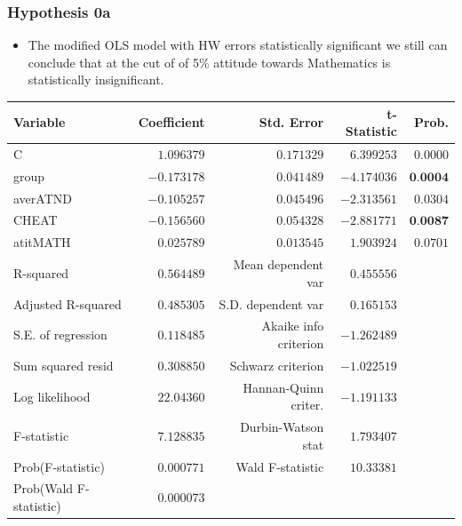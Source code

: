 \documentclass{beamer} %
\theoremstyle{definition}
\begin{document}
	\begin{frame}
		\frametitle{Hypothesis 0a}
		\centering 
		\begin{itemize}
			\item The modified OLS model with HW errors statistically significant we still can conclude that at the cut of of 5\% attitude towards Mathematics is statistically insignificant.  
		\end{itemize}
		\vspace{1em}
			\begin{table}[!htbp]
			\centering
			\tiny
			\begin{tabular}{lrrrr}
				\hline
				Variable & Coefficient & Std. Error & t-Statistic & Prob. \\
				\hline
				C & $1.096379$  & $0.171329$  & $6.399253$  & $0.0000$ \\
				group & $-0.173178$ & $0.041489$  & $-4.174036$ & $\textbf{0.0004}$ \\
				averATND & $-0.105257$ & $0.045496$  & $-2.313561$ & $0.0304$ \\
				CHEAT & $-0.156560$ & $0.054328$  & $-2.881771$ & $\textbf{0.0087}$ \\
				atitMATH & $0.025789$  & $0.013545$  & $1.903924$  & $0.0701$ \\
				\hline
				R-squared & $0.564489$ & Mean dependent var & $0.455556$ &  \\
				Adjusted R-squared & $0.485305$ & S.D. dependent var & $0.165153$ &  \\
				S.E. of regression & $0.118485$ & Akaike info criterion & $-1.262489$ &  \\
				Sum squared resid & $0.308850$ & Schwarz criterion & $-1.022519$ &  \\
				Log likelihood & $22.04360$ & Hannan-Quinn criter. & $-1.191133$ &  \\
				F-statistic & $7.128835$ & Durbin-Watson stat & $1.793407$ &  \\
				Prob(F-statistic) & $0.000771$ & Wald F-statistic & $10.33381$ &  \\
				Prob(Wald F-statistic) & $0.000073$ &  &  &  \\
				\hline
			\end{tabular}
		\end{table}
		
	\end{frame}
\end{document}
